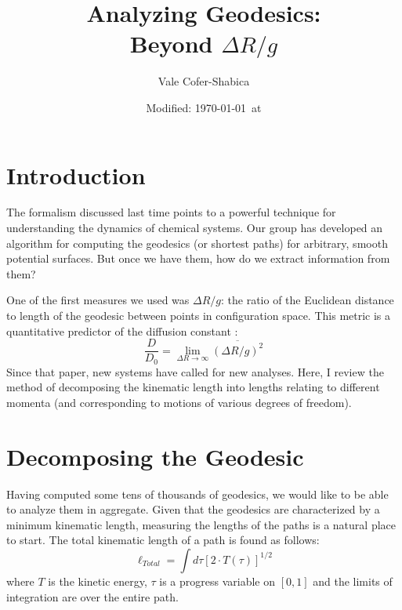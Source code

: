 \documentclass[letterpaper,12pt]{article}
\title{Analyzing Geodesics:\\Beyond $\Delta R / g$}
\date{Modified: \today\ at \currenttime}
\author{Vale Cofer-Shabica}
\begin{document}
\maketitle


\section*{Introduction}
The formalism discussed last time points to a powerful technique for understanding the dynamics of chemical systems. Our group has developed an algorithm for computing the geodesics (or shortest paths) for arbitrary, smooth potential surfaces. But once we have them, how do we extract information from them?

One of the first measures we used was $\Delta R/g$: the ratio of the Euclidean distance to length of the geodesic between points in configuration space. This metric is a quantitative predictor of the diffusion constant \cite{wang:2007:geodesics}:
\begin{equation*}
\frac{D}{D_{0}} = \lim_{\Delta R \to \infty} \overline{(\Delta R/g)^2}
\end{equation*}
Since that paper, new systems have called for new analyses. Here, I review the method of decomposing the kinematic length into lengths relating to different momenta (and corresponding to motions of various degrees of freedom).


\section{Decomposing the Geodesic}
Having computed some tens of thousands of geodesics, we would like to be able to analyze them in aggregate. Given that the geodesics are characterized by a minimum kinematic length, measuring the lengths of the paths is a natural place to start. The total kinematic length of a path is found as follows:
\begin{equation} \label{eqn:ltotal0}
\ell_{Total} = \int d\tau \left[ 2 \cdot T(\tau) \right]^{1/2}
\end{equation}
where $T$ is the kinetic energy, $\tau$ is a progress variable on $[0,1]$ and the limits of integration are over the entire path.
\end{document}
